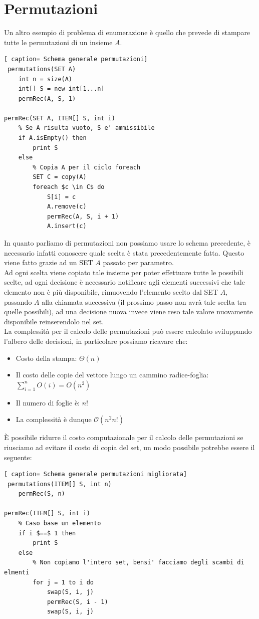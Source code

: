 \documentclass[../cheatSheetAlgoritmi.tex]{subfiles}
\begin{document}
\section{Permutazioni}
Un altro esempio di problema di enumerazione è quello che prevede di stampare tutte le permutazioni di un insieme $A$.
 \begin{lstlisting}[ caption= Schema generale permutazioni]
 permutations(SET A)
	int n = size(A)
	int[] S = new int[1...n]
	permRec(A, S, 1)

permRec(SET A, ITEM[] S, int i)
	% Se A risulta vuoto, S e' ammissibile
	if A.isEmpty() then
		print S
	else
		% Copia A per il ciclo foreach
		SET C = copy(A)
		foreach $c \in C$ do
			S[i] = c
			A.remove(c)
			permRec(A, S, i + 1)
			A.insert(c)
\end{lstlisting}
In quanto parliamo di permutazioni non possiamo usare lo schema precedente, è necessario infatti conoscere quale scelta è stata precedentemente fatta. Questo viene fatto grazie ad un SET $A$ passato per parametro. \\
Ad ogni scelta viene copiato tale insieme per poter effettuare tutte le possibili scelte, ad ogni decisione è necessario notificare agli elementi successivi che tale elemento non è più disponibile, rimuovendo l'elemento scelto dal SET $A$, passando $A$ alla chiamata successiva (il prossimo passo non avrà tale scelta tra quelle possibili), ad una decisione nuova invece viene reso tale valore nuovamente disponibile reinserendolo nel set. \\
La complessità per il calcolo delle permutazioni può essere calcolato sviluppando l'albero delle decisioni, in particolare possiamo ricavare che:
\begin{itemize}
	\item Costo della stampa: $\Theta(n)$
	\item Il costo delle copie del vettore lungo un cammino radice-foglia:
	$\sum_{i = 1}^{n} O(i) = O(n^2)$
	\item Il numero di foglie è: $n!$
	\item La complessità è dunque $\mathcal{O}(n^2n!)$
\end{itemize}
È possibile ridurre il costo computazionale per il calcolo delle permutazioni se riusciamo ad evitare il costo di copia del set, un modo possibile potrebbe essere il seguente:
 \begin{lstlisting}[ caption= Schema generale permutazioni migliorata]
 permutations(ITEM[] S, int n)
	permRec(S, n)

permRec(ITEM[] S, int i)
	% Caso base un elemento
	if i $==$ 1 then
		print S
	else
		% Non copiamo l'intero set, bensi' facciamo degli scambi di elmenti
		for j = 1 to i do
			swap(S, i, j)
			permRec(S, i - 1)
			swap(S, i, j)
\end{lstlisting}
\end{document}
